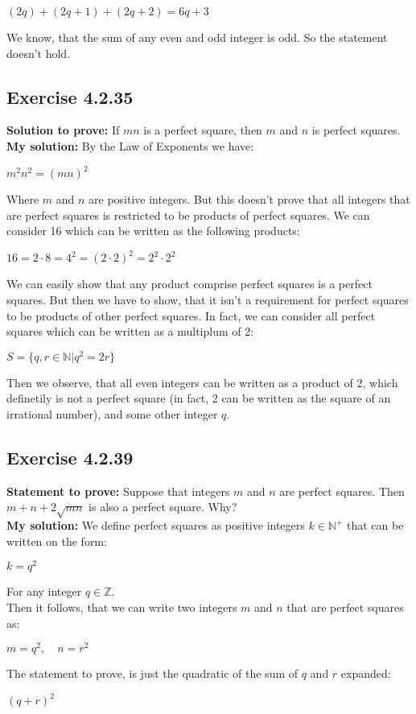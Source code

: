 \documentclass{article}
\newcommand{\cent}[1]{\begin{center}#1\end{center}}
\newcommand{\doubleZ}{\mathbb{Z}}
\newcommand{\doubleN}{\mathbb{N}}
\newcommand{\Prove}{\textbf{Statement to prove: }}
\newcommand{\Solution}{\textbf{My solution: }}
\newcommand{\QED}{\boxed{}}
\newcommand{\Exercise}[1]{\subsection*{Exercise #1}}
\begin{document}
	\cent{$(2q) + (2q+1) + (2q+2) = 6q+3$}
	
	We know, that the sum of any even and odd integer is odd. So the statement doesn't hold.
	
	\QED
	
	\Exercise{4.2.35}
	\textbf{Solution to prove:}
	If $mn$ is a perfect square, then $m$ and $n$ is perfect squares.\\
	
	\Solution
	By the Law of Exponents we have:
	\cent{$ m^2 n^2=(mn)^2$}
	
	Where $m$ and $n$ are positive integers. But this doesn't prove that all integers that are perfect squares is restricted to be products of perfect squares. We can consider 16 which can be written as the following products:
	
	\cent{$16 = 2 \cdot 8 = 4^2 = (2 \cdot 2)^2 = 2^2 \cdot 2^2$}
	
	We can easily show that any product comprise perfect squares is a perfect squares. But then we have to show, that it isn't a requirement for perfect squares to be products of other perfect squares. In fact, we can consider all perfect squares which can be written as a multiplum of 2:
	
	\cent{$S = \{q,r \in \doubleN | q^2 = 2r\}$}
	
	Then we observe, that all even integers can be written as  a product of 2, which definetily is not a perfect square (in fact, 2 can be written as the square of an irrational number), and some other integer $q$.\\
	\QED
	
	\Exercise{4.2.39}
	
	\Prove
	Suppose that integers $m$ and $n$ are perfect squares. Then $m+n+2\sqrt{mn}$ is also a perfect square. Why?\\
	
	\Solution
	We define perfect squares as positive integers $k \in \doubleN^+$ that can be written on the form:
	
 	\cent{$k = q^2$}
 	
 	For any integer $q \in \doubleZ$.\\
 	
 	Then it follows, that we can write two integers $m$ and $n$ that are perfect squares as:
 	
 	\cent{$m = q^2, \quad n = r^2$}
	
	The statement to prove, is just the quadratic of the sum of $q$ and $r$ expanded:
	 \cent{$(q+r)^2$} 
	 
\end{document}
